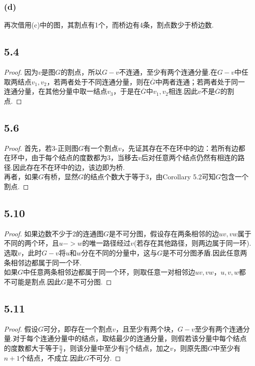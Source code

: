 \documentclass[twocolumn]{article}
\newenvironment{SChinese}{%
	\CJKfamily{gbsn}%
	\CJKtilde
	\CJKnospace}{}
\begin{document}
\begin{CJK}{UTF8}{}
\begin{SChinese}
					\subsubsection*{(d)}
						再次借用(c)中的图，其割点有1个，而桥边有4条，割点数少于桥边数.
				\subsection*{5.4}
					\begin{proof}
						因为$v$是图$G$的割点，所以$G-v$不连通，至少有两个连通分量.在$G-v$中任取两结点$v_1,v_2$，若两者处于不同连通分量，则在$\overline{G}$中两者连通；若两者处于同一连通分量，在其他分量中取一结点$v_3$，于是在$\overline{G}$中$v_1,v_2$相连.因此$v$不是$\overline{G}$的割点.
					\end{proof}
				\subsection*{5.6}
					\begin{proof}
						首先，若3-正则图$G$有一个割点$v$，先证其存在不在环中的边：若所有边都在环中，由于每个结点的度数都为3，当移去$v$后对任意两个结点仍然有相连的路径.因此存在不在环中的边，该边即为桥.\\
						再者，如果$G$有桥，显然$G$的结点个数大于等于3，由Corollary 5.2可知$G$包含一个割点.
					\end{proof}
				\subsection*{5.10}
					\begin{proof}
						如果边数不少于2的连通图$G$是不可分图，假设存在两条相邻的边$uv,vw$属于不同的两个环，且$u->w$的唯一路径经过$v$(若存在其他路径，则两边属于同一环).选取$v$，此时$G-v$将$u$和$w$分在不同的分量中，这与$G$是不可分图矛盾.因此任意两条相邻边都属于同一个环.\\
						如果$G$中任意两条相邻边都属于同一个环，则取任意一对相邻边$uv,vw$，$u,v,w$都不可能是割点.因此$G$是不可分图.
					\end{proof}
				\subsection*{5.11}
					\begin{proof}
						假设$G$可分，即存在一个割点$v$，且至少有两个块，$G-v$至少有两个连通分量.对于每个连通分量中的结点，取结最少的连通分量，则假若该分量中每个结点的度数都大于等于$\frac{n}{2}$，则该分量中至少有$\frac{n}{2}$个结点，加之$v$，则原先图$G$中至少有$n+1$个结点，不成立.因此$G$不可分.
					\end{proof}

\end{SChinese}
\end{CJK}
\end{document}
